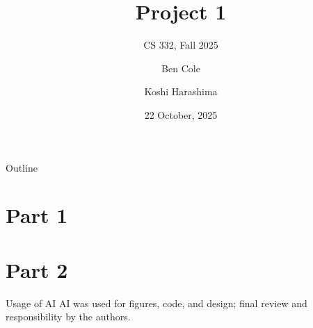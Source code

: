 \documentclass{beamer}
\title[Project 1]{Project 1}
\subtitle{CS 332, Fall 2025}
\author{Ben Cole \and Koshi Harashima}
\date{22 October, 2025}
\begin{document}
\maketitle

\begin{frame}{Outline}
  \tableofcontents
\end{frame}


\section{Part 1}
\section{Part 2}

\begin{frame}{Usage of AI}
    AI was used for figures, code, and design; final review and responsibility by the authors.
\end{frame}
\end{document}
